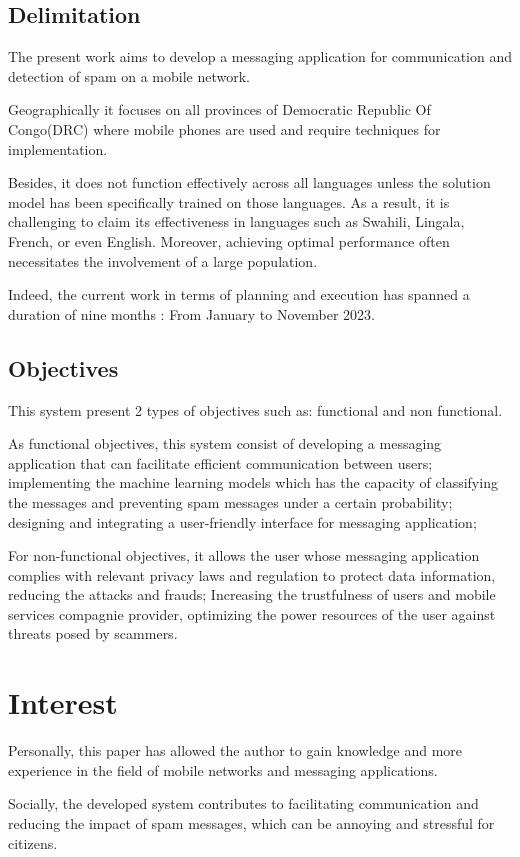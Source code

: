 \documentclass[12pt,a4paper]{report}
\begin{document}
	\subsection{Delimitation}
	The present work aims to develop a messaging application for communication and detection of spam on a mobile network.
	
	Geographically it focuses on all provinces of Democratic Republic Of Congo(DRC) where mobile phones are used and require techniques for implementation. 
	
	Besides, it does not function effectively across all languages unless the solution model has been specifically trained on those languages. As a result, it is challenging to claim its effectiveness in languages such as Swahili, Lingala, French, or even English. Moreover, achieving optimal performance often necessitates the involvement of a large population.
	
	Indeed, the current work in terms of planning and execution has spanned a duration of nine months : From January to November 2023. 
	\subsection{Objectives}
	This system present 2 types of objectives such as: functional and non functional.
	
	As functional objectives, this system consist of developing a messaging application that can facilitate efficient communication between users; implementing the machine learning models which has the capacity of classifying the messages and preventing spam messages under a certain probability; designing and integrating a user-friendly interface for messaging application;  
		
	For non-functional objectives, it allows the user whose messaging application complies with relevant privacy laws and regulation to protect data information, reducing the attacks and frauds; Increasing the trustfulness of users and mobile services compagnie provider, optimizing the power resources of the user against threats posed by scammers. 
	
	\section{Interest} 
	Personally, this paper has allowed the author to gain knowledge and more experience in the field of mobile networks and messaging applications. 

	Socially, the developed system contributes to facilitating communication and reducing the impact  of spam messages, which can be annoying and stressful for citizens.
	
\end{document}
